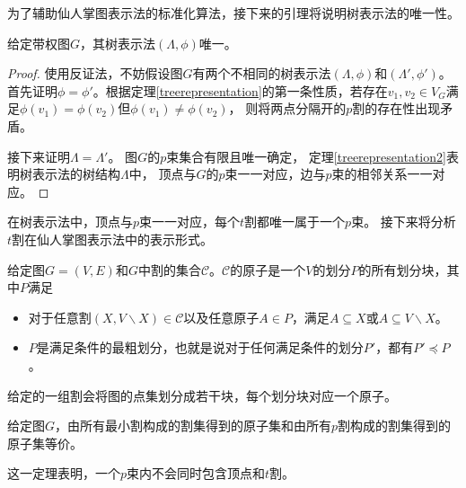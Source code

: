 为了辅助仙人掌图表示法的标准化算法，接下来的引理将说明树表示法的唯一性。

\begin{lemma}[树表示法的唯一性]
  \label{treeunique}
  给定带权图$G$，其树表示法$(\Lambda,\phi)$唯一。
\end{lemma}
\begin{proof}
  使用反证法，不妨假设图$G$有两个不相同的树表示法$(\Lambda,\phi)$和$(\Lambda',\phi')$。
  首先证明$\phi=\phi'$。根据定理\ref{treerepresentation}的第一条性质，若存在$v_1,v_2\in V_G$满足$\phi(v_1)=\phi(v_2)$但$\phi(v_1)\neq\phi(v_2)$，
  则将两点分隔开的$p$割的存在性出现矛盾。

  接下来证明$\Lambda=\Lambda'$。
  图$G$的$p$束集合有限且唯一确定，
  定理\ref{treerepresentation2}表明树表示法的树结构$\Lambda$中，
  顶点与$G$的$p$束一一对应，边与$p$束的相邻关系一一对应。
\end{proof}

在树表示法中，顶点与$p$束一一对应，每个$t$割都唯一属于一个$p$束。
接下来将分析$t$割在仙人掌图表示法中的表示形式。

\begin{definition}[原子]
  给定图$G=(V,E)$和$G$中割的集合$\mathcal{C}$。$\mathcal{C}$的原子是一个$V$的划分$P$的所有划分块，其中$P$满足
  \begin{itemize}
    \item 对于任意割$(X,V\backslash X)\in \mathcal{C}$以及任意原子$A\in P$，满足$A\subseteq X$或$A\subseteq V\backslash X$。
    \item $P$是满足条件的最粗划分，也就是说对于任何满足条件的划分$P'$，都有$P'\preceq P$。
  \end{itemize}
\end{definition}

给定的一组割会将图的点集划分成若干块，每个划分块对应一个原子。

\begin{theorem}\cite{dinitz1976structure}
  给定图$G$，由所有最小割构成的割集得到的原子集和由所有$p$割构成的割集得到的原子集等价。
\end{theorem}

这一定理表明，一个$p$束内不会同时包含顶点和$t$割。

